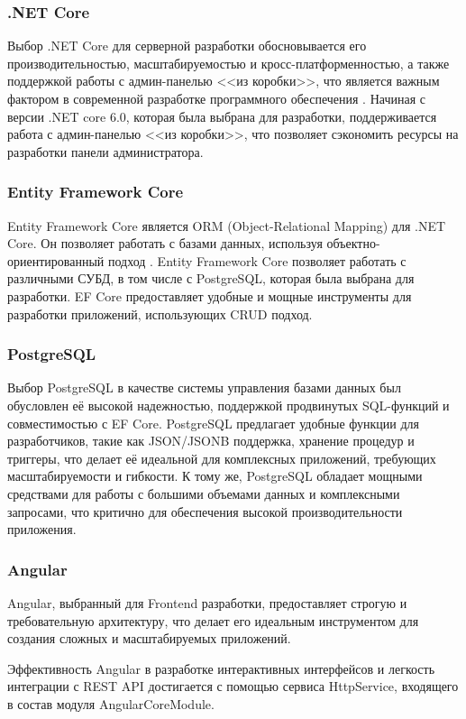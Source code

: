 \subsubsection{.NET Core}
Выбор .NET Core для серверной разработки обосновывается его производительностью, масштабируемостью и кросс-платформенностью, а также поддержкой работы с админ-панелью <<из коробки>>, что является важным фактором в современной разработке программного обеспечения \cite{mark_price}.
Начиная с версии .NET core 6.0, которая была выбрана для разработки, поддерживается работа с админ-панелью <<из коробки>>, что позволяет сэкономить ресурсы на разработки панели администратора.

\subsubsection{Entity Framework Core}
Entity Framework Core является ORM (Object-Relational Mapping) для .NET Core. Он позволяет работать с базами данных, используя объектно-ориентированный подход \cite{grinchenko}. Entity Framework Core позволяет работать с различными СУБД, в том числе с PostgreSQL, которая была выбрана для разработки. EF Core предоставляет удобные и мощные инструменты для разработки приложений, использующих CRUD подход.

\subsubsection{PostgreSQL}
Выбор PostgreSQL в качестве системы управления базами данных был обусловлен её высокой надежностью, поддержкой продвинутых SQL-функций и совместимостью с EF Core. PostgreSQL предлагает удобные функции для разработчиков, такие как JSON/JSONB поддержка, хранение процедур и триггеры, что делает её идеальной для комплексных приложений, требующих масштабируемости и гибкости. К тому же, PostgreSQL обладает мощными средствами для работы с большими объемами данных и комплексными запросами, что критично для обеспечения высокой производительности приложения.

\subsubsection{Angular}
Angular, выбранный для Frontend разработки, предоставляет строгую и требовательную архитектуру, что делает его идеальным инструментом для создания сложных и масштабируемых приложений.

Эффективность Angular в разработке интерактивных интерфейсов и легкость интеграции с REST API достигается с помощью сервиса HttpService, входящего в состав модуля AngularCoreModule.

